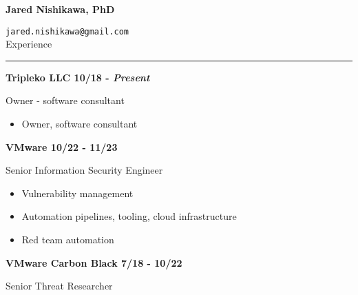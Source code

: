 \documentclass{letter}
\begin{document}
\newcommand{\vspc}{\vskip5mm}


\renewcommand\labelitemi{\raisebox{0.25ex}{\tiny$\bullet$}}

\textbf{\Huge{Jared Nishikawa, PhD}}

\texttt{jared.nishikawa@gmail.com} \\


\large{Experience}
\hrule

\textbf{Tripleko LLC \hfill 10/18 - \textit{Present}}

Owner - software consultant

\begin{itemize}
    \setlength\itemsep{-0.5em}
    \item Owner, software consultant
\end{itemize}

\textbf{VMware \hfill 10/22 - 11/23}

Senior Information Security Engineer

\begin{itemize}
    \setlength\itemsep{-0.5em}
    \item Vulnerability management
    \item Automation pipelines, tooling, cloud infrastructure
    \item Red team automation
\end{itemize}

\textbf{VMware Carbon Black \hfill 7/18 - 10/22}

Senior Threat Researcher
\end{document}

